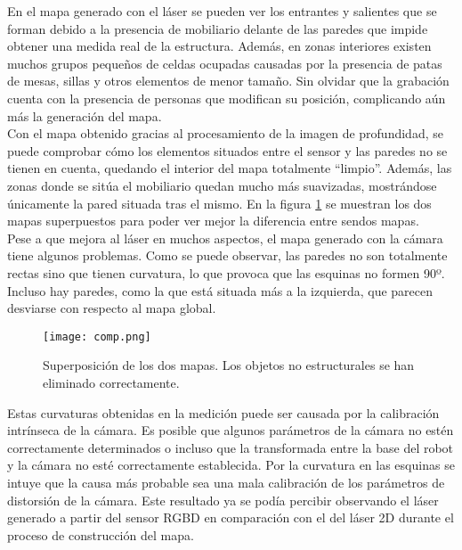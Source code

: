 En el mapa generado con el láser se pueden ver los entrantes y salientes que se forman debido a la presencia de mobiliario delante de las paredes que impide obtener una medida real de la estructura. Además, en zonas interiores existen muchos grupos pequeños de celdas ocupadas causadas por la presencia de patas de mesas, sillas y otros elementos de menor tamaño. Sin olvidar que la grabación cuenta con la presencia de personas que modifican su posición, complicando aún más la generación del mapa.\\

Con el mapa obtenido gracias al procesamiento de la imagen de profundidad, se puede comprobar cómo los elementos situados entre el sensor y las paredes no se tienen en cuenta, quedando el interior del mapa totalmente ``limpio''. Además, las zonas donde se sitúa el mobiliario quedan mucho más suavizadas, mostrándose únicamente la pared situada tras el mismo. En la figura \ref{fig:comp} se muestran los dos mapas superpuestos para poder ver mejor la diferencia entre sendos mapas.\\

Pese a que mejora al láser en muchos aspectos, el mapa generado con la cámara tiene algunos problemas. Como se puede observar, las paredes no son totalmente rectas sino que tienen curvatura, lo que provoca que las esquinas no formen 90º. Incluso hay paredes, como la que está situada más a la izquierda, que parecen desviarse con respecto al mapa global.\\

\begin{figure}[h]
	\begin{center} 
		\texttt{[image: comp.png]}
	\end{center}
	\caption{Superposición de los dos mapas. Los objetos no estructurales se han eliminado correctamente.}
	\label{fig:comp}
\end{figure}

Estas curvaturas obtenidas en la medición puede ser causada por la calibración intrínseca de la cámara. Es posible que algunos parámetros de la cámara no estén correctamente determinados o incluso que la transformada entre la base del robot y la cámara no esté correctamente establecida. Por la curvatura en las esquinas se intuye que la causa más probable sea una mala calibración de los parámetros de distorsión de la cámara. Este resultado ya se podía percibir observando el láser generado a partir del sensor RGBD en comparación con el del láser 2D durante el proceso de construcción del mapa.\\

